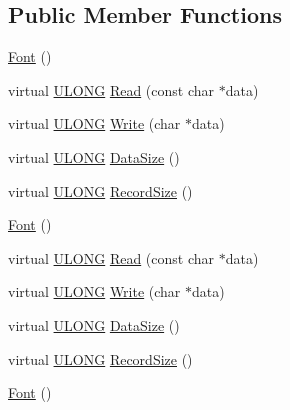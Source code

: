 \subsection*{Public Member Functions}
\begin{DoxyCompactItemize}
\item 
\hyperlink{struct_y_excel_1_1_workbook_1_1_font_acb4090cf4dcbb001d52e7fb1bbf1af02}{Font} ()
\item 
virtual \hyperlink{_basic_excel_8hpp_abe09d1bea023be6a07cbadde8e955435}{U\+L\+O\+N\+G} \hyperlink{struct_y_excel_1_1_workbook_1_1_font_ad69264a5c5eba87d2a975251e71a69b9}{Read} (const char $\ast$data)
\item 
virtual \hyperlink{_basic_excel_8hpp_abe09d1bea023be6a07cbadde8e955435}{U\+L\+O\+N\+G} \hyperlink{struct_y_excel_1_1_workbook_1_1_font_a027455cca5793c3976b0e692f4f5c072}{Write} (char $\ast$data)
\item 
virtual \hyperlink{_basic_excel_8hpp_abe09d1bea023be6a07cbadde8e955435}{U\+L\+O\+N\+G} \hyperlink{struct_y_excel_1_1_workbook_1_1_font_ab484448473812d4bdd0cc626f3ed7aa1}{Data\+Size} ()
\item 
virtual \hyperlink{_basic_excel_8hpp_abe09d1bea023be6a07cbadde8e955435}{U\+L\+O\+N\+G} \hyperlink{struct_y_excel_1_1_workbook_1_1_font_a8307607ca8684367efda68cb95ee7af8}{Record\+Size} ()
\item 
\hyperlink{struct_y_excel_1_1_workbook_1_1_font_acb4090cf4dcbb001d52e7fb1bbf1af02}{Font} ()
\item 
virtual \hyperlink{_basic_excel_8hpp_abe09d1bea023be6a07cbadde8e955435}{U\+L\+O\+N\+G} \hyperlink{struct_y_excel_1_1_workbook_1_1_font_aeae63a307623ea4303e730f9dd555206}{Read} (const char $\ast$data)
\item 
virtual \hyperlink{_basic_excel_8hpp_abe09d1bea023be6a07cbadde8e955435}{U\+L\+O\+N\+G} \hyperlink{struct_y_excel_1_1_workbook_1_1_font_af07e3d7f198dcdb122c0514c42a54a76}{Write} (char $\ast$data)
\item 
virtual \hyperlink{_basic_excel_8hpp_abe09d1bea023be6a07cbadde8e955435}{U\+L\+O\+N\+G} \hyperlink{struct_y_excel_1_1_workbook_1_1_font_a2f09cd0e2ba46a99cf63b2512b5c9cf2}{Data\+Size} ()
\item 
virtual \hyperlink{_basic_excel_8hpp_abe09d1bea023be6a07cbadde8e955435}{U\+L\+O\+N\+G} \hyperlink{struct_y_excel_1_1_workbook_1_1_font_a7a42ca0185994755c4817cf5c7569435}{Record\+Size} ()
\item 
\hyperlink{struct_y_excel_1_1_workbook_1_1_font_acb4090cf4dcbb001d52e7fb1bbf1af02}{Font} ()
\item 

\end{DoxyCompactItemize}
